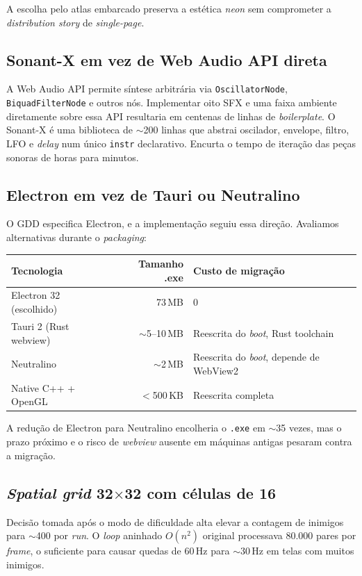 A escolha pelo atlas embarcado preserva a estética \emph{neon} sem comprometer a
\emph{distribution story} de \emph{single-page}.

\subsection{Sonant-X em vez de Web Audio API direta}

A Web Audio API permite síntese arbitrária via \texttt{OscillatorNode},
\texttt{BiquadFilterNode} e outros nós. Implementar oito SFX e uma faixa ambiente
diretamente sobre essa API resultaria em centenas de linhas de \emph{boilerplate}.
O Sonant-X é uma biblioteca de $\sim$200 linhas que abstrai oscilador, envelope,
filtro, LFO e \emph{delay} num único \texttt{instr} declarativo. Encurta o tempo de
iteração das peças sonoras de horas para minutos.

\subsection{Electron em vez de Tauri ou Neutralino}

O GDD especifica Electron, e a implementação seguiu essa direção. Avaliamos
alternativas durante o \emph{packaging}:

\begin{tabular}{lrl}
  \toprule
  \textbf{Tecnologia} & \textbf{Tamanho .exe} & \textbf{Custo de migração} \\
  \midrule
  Electron 32 (escolhido) & 73\,MB & 0 \\
  Tauri 2 (Rust webview) & $\sim$5--10\,MB & Reescrita do \emph{boot}, Rust toolchain \\
  Neutralino & $\sim$2\,MB & Reescrita do \emph{boot}, depende de WebView2 \\
  Native C++ + OpenGL & $<$500\,KB & Reescrita completa \\
  \bottomrule
\end{tabular}

A redução de Electron para Neutralino encolheria o \texttt{.exe} em $\sim$35
vezes, mas o prazo próximo e o risco de \emph{webview} ausente em máquinas antigas
pesaram contra a migração.

\subsection{\emph{Spatial grid} 32$\times$32 com células de 16}

Decisão tomada após o modo de dificuldade alta elevar a contagem de inimigos para
$\sim$400 por \emph{run}. O \emph{loop} aninhado $O(n^2)$ original processava
80.000 pares por \emph{frame}, o suficiente para causar quedas de 60\,Hz para
$\sim$30\,Hz em telas com muitos inimigos.

